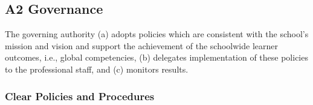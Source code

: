 
\subsection{A2 Governance}

The governing authority (a) adopts policies which are consistent with the school’s mission and vision and support the achievement of the schoolwide learner outcomes, i.e., global competencies, (b) delegates implementation of these policies to the professional staff, and (c) monitors results.

\subsubsection{Clear Policies and Procedures}




